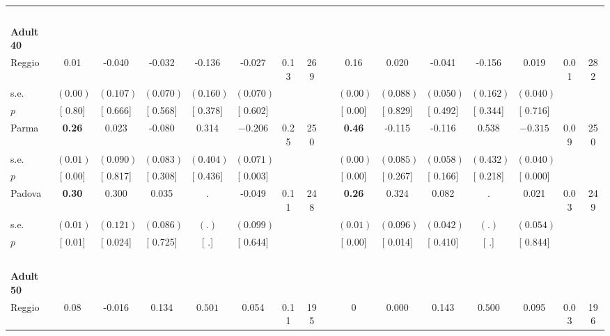 \begin{longtable}{L{8em} c c c c c c c p{1em} c c c c c c c}
~\\[1em]
\quad \quad \textbf{Adult 40} & & & & & & & & & & & & & & & \\* 
\quad \quad \quad Reggio& 0.01 &    -0.040 &    -0.032 &    -0.136 &    -0.027 &      0.13 &       269 & & 0.16 &     0.020 &    -0.041 &    -0.156 &     0.019 &      0.01 &       282  \\*
\quad \quad \quad \quad s.e.& $ (     0.00)$ & $ (    0.107)$ & $ (    0.070)$ & $ (    0.160)$ & $ (    0.070)$ & & & & $ (     0.00)$ & $ (    0.088)$ & $ (    0.050)$ & $ (    0.162)$ & $ (    0.040)$ & &  \\*
\quad \quad \quad \quad $ p$ & [     0.80] & [    0.666] & [    0.568] & [    0.378] & [    0.602] & & & & [     0.00] & [    0.829] & [    0.492] & [    0.344] & [    0.716] & &  \\[1em]
\quad \quad \quad Parma& \textbf{     0.26} &     0.023 &    -0.080 &     0.314 & $ \mathbf{   -0.206}$ &      0.25 &       250 & & \textbf{     0.46} &    -0.115 &    -0.116 &     0.538 & $ \mathbf{   -0.315}$ &      0.09 &       250  \\*
\quad \quad \quad \quad s.e.& $ (     0.01)$ & $ (    0.090)$ & $ (    0.083)$ & $ (    0.404)$ & $ (    0.071)$ & & & & $ (     0.00)$ & $ (    0.085)$ & $ (    0.058)$ & $ (    0.432)$ & $ (    0.040)$ & &  \\*
\quad \quad \quad \quad $ p$ & [     0.00] & [    0.817] & [    0.308] & [    0.436] & [    0.003] & & & & [     0.00] & [    0.267] & [    0.166] & [    0.218] & [    0.000] & &  \\[1em]
\quad \quad \quad Padova& \textbf{     0.30} & $ \mathbf{    0.300}$ &     0.035 &         . &    -0.049 &      0.11 &       248 & & \textbf{     0.26} & $ \mathbf{    0.324}$ &     0.082 &         . &     0.021 &      0.03 &       249  \\*
\quad \quad \quad \quad s.e.& $ (     0.01)$ & $ (    0.121)$ & $ (    0.086)$ & $ (        .)$ & $ (    0.099)$ & & & & $ (     0.01)$ & $ (    0.096)$ & $ (    0.042)$ & $ (        .)$ & $ (    0.054)$ & &  \\*
\quad \quad \quad \quad $ p$ & [     0.01] & [    0.024] & [    0.725] & [        .] & [    0.644] & & & & [     0.00] & [    0.014] & [    0.410] & [        .] & [    0.844] & &  \\[1em]
~\\[1em]
\quad \quad \textbf{Adult 50} & & & & & & & & & & & & & & & \\* 
\quad \quad \quad Reggio& 0.08 &    -0.016 &     0.134 & $ \mathbf{    0.501}$ &     0.054 &      0.11 &       195 & & 0 &     0.000 &     0.143 & $ \mathbf{    0.500}$ &     0.095 &      0.03 &       196  \\*

\end{longtable}
